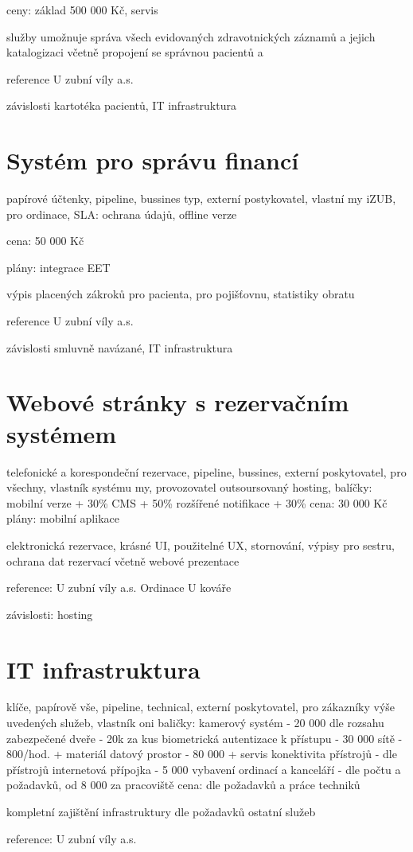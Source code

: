\documentclass[12pt, a4paper, titlepage]{article}
\begin{document}
	ceny:
		základ 500 000 Kč,
		servis 

	služby umožnuje správa všech evidovaných zdravotnických záznamů a jejich katalogizaci včetně propojení se správnou pacientů a 

	reference
		U zubní víly a.s.

	závislosti
		kartotéka pacientů, IT infrastruktura

	\section{Systém pro správu financí}
	papírové účtenky, pipeline, bussines typ, externí postykovatel, vlastní my iZUB, pro ordinace,
	SLA:
		ochrana údajů, offline verze

	cena:
		50 000 Kč

	plány:
		integrace EET

	výpis placených zákroků pro pacienta, pro pojišťovnu, statistiky obratu

	reference
		U zubní víly a.s.


	závislosti
		smluvně navázané, IT infrastruktura

	\section{Webové stránky s rezervačním systémem}
	telefonické a korespondeční rezervace, pipeline, bussines, externí poskytovatel, pro všechny,
	vlastník systému my, provozovatel outsoursovaný hosting, 
	balíčky:
		mobilní verze + 30\%
		CMS + 50\% 
		rozšířené notifikace + 30\%
	cena:
		30 000 Kč
	plány:
		mobilní aplikace

	elektronická rezervace, krásné UI, použitelné UX, stornování, výpisy pro sestru, ochrana dat rezervací
	včetně webové prezentace

	reference:
		U zubní víly a.s.
		Ordinace U kováře

	závislosti:
		hosting

	\section{IT infrastruktura}
	klíče, papírově vše, pipeline, technical, externí poskytovatel, pro zákazníky výše uvedených služeb,
	vlastník oni
	baličky:
		kamerový systém - 20 000 dle rozsahu
		zabezpečené dveře - 20k za kus
		biometrická autentizace k přístupu - 30 000
		sítě - 800/hod. + materiál
		datový prostor - 80 000 + servis
		konektivita přístrojů - dle přístrojů
		internetová přípojka - 5 000
		vybavení ordinací a kanceláří - dle počtu a požadavků, od 8 000 za pracoviště
	cena:
		dle požadavků a práce techniků

	kompletní zajištění infrastruktury dle požadavků ostatní služeb

	reference:
		U zubní víly a.s.
\end{document}
